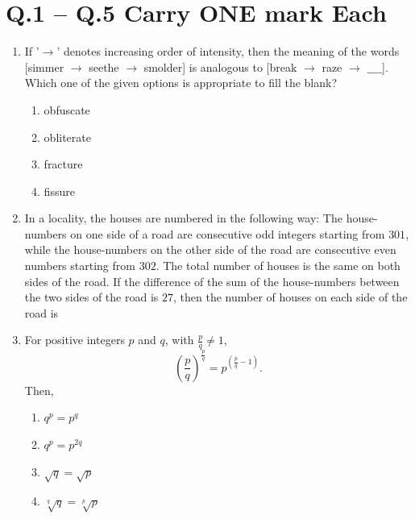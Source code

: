 \documentclass[journal]{IEEEtran}
\begin{document}
\section*{Q.1 -- Q.5 Carry ONE mark Each}
\begin{enumerate}

\item If '$\rightarrow$' denotes increasing order of intensity, then the meaning of the words  
[simmer $\rightarrow$ seethe $\rightarrow$ smolder] is analogous to  
[break $\rightarrow$ raze $\rightarrow$  $\_\_\_\_$].  
Which one of the given options is appropriate to fill the blank?  
\hfill {} 
\begin{enumerate}
\item obfuscate
\item obliterate
\item fracture
\item fissure
\end{enumerate}

\item In a locality, the houses are numbered in the following way:  
The house-numbers on one side of a road are consecutive odd integers starting from $301$, while the house-numbers on the other side of the road are consecutive even numbers starting from $302$. The total number of houses is the same on both sides of the road.  
If the difference of the sum of the house-numbers between the two sides of the road is $27$, then the number of houses on each side of the road is  
\hfill {}
\begin{enumerate}
\end{enumerate}

\item For positive integers $p$ and $q$, with $\frac{p}{q} \neq 1$,  
$$\left(\frac{p}{q}\right)^{\frac{p}{q}} = p^{\left(\frac{p}{q} - 1\right)}.$$  
Then,  
\hfill {}
\begin{enumerate}
\item $q^p = p^q$  
\item $q^p = p^{2q}$  
\item $\sqrt{q} = \sqrt{p}$  
\item $\sqrt[q]{q} = \sqrt[p]{p}$  
\end{enumerate}


\end{enumerate}
\end{document}
